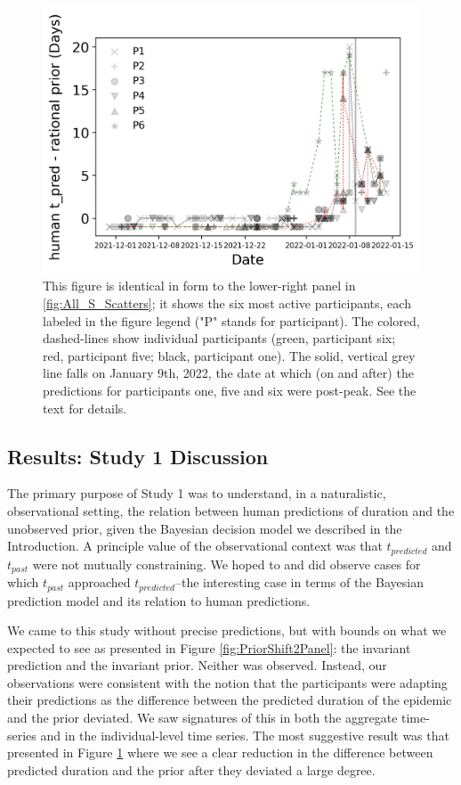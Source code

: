 \documentclass[a4paper,man,natbib]{apa6}
\begin{document}
\begin{figure}
    \centering
    \includegraphics[width=\linewidth]{Figures/Single_Ss_Date_Summary.png}
    \caption{This figure is identical in form to the lower-right panel in \ref{fig:All_S_Scatters}; it shows the six most active participants, each labeled in the figure legend ("P" stands for participant).  The colored, dashed-lines show individual participants (green, participant six; red, participant five; black, participant one). The solid, vertical grey line falls on January 9th, 2022, the date at which (on and after) the predictions for participants one, five and six were post-peak.  See the text for details.}
    \label{fig:Single_Ss_Summary_2}
\end{figure}

\subsection{Results: Study 1 Discussion}
The primary purpose of Study 1 was to understand, in a naturalistic, observational setting, the relation between human predictions of duration and the unobserved prior, given the Bayesian decision model we described in the Introduction.  A principle value of the observational context was that $t_{predicted}$ and $t_{past}$ were not mutually constraining.  We hoped to and did observe cases for which $t_{past}$ approached $t_{predicted}$--the interesting case in terms of the Bayesian prediction model and its relation to human predictions. 

We came to this study without precise predictions, but with bounds on what we expected to see as presented in Figure \ref{fig:PriorShift2Panel}: the invariant prediction and the invariant prior.  Neither was observed.  Instead, our observations were consistent with the notion that the participants were adapting their predictions as the difference between the predicted duration of the epidemic and the prior deviated.  We saw signatures of this in both the aggregate time-series and in the individual-level time series.  The most suggestive result was that presented in Figure \ref{fig:Single_Ss_Summary_2} where we see a clear reduction in the difference between predicted duration and the prior after they deviated a large degree. 
\end{document}
